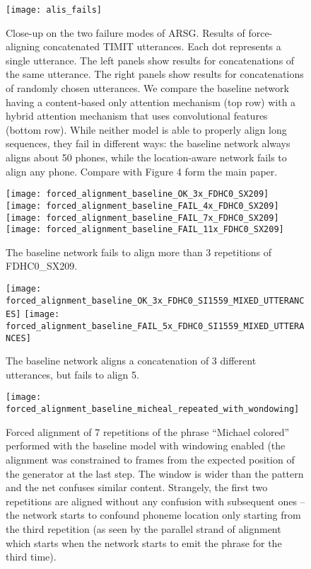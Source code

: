 \documentclass{article}
\begin{document}
\begin{figure}[h]
  \centering
  \texttt{[image: alis\_fails]}
  \caption[Results of force-aligning of long utterances.]{Close-up on
    the two failure modes of ARSG. Results of
    force-aligning concatenated TIMIT utterances. Each dot represents
    a single utterance. The left panels show results for
    concatenations of the same utterance. The right panels show
    results for concatenations of randomly chosen utterances. We
    compare the baseline network having a content-based only attention
    mechanism (top row) with a hybrid attention mechanism that uses
    convolutional features (bottom row). While neither model is able
    to properly align long sequences, they fail in different ways: the
    baseline network always aligns about 50 phones, while the
    location-aware network fails to align any phone. Compare with
    Figure 4 form the main paper.}
\end{figure}

\begin{sidewaysfigure}[h]
  \texttt{[image: forced\_alignment\_baseline\_OK\_3x\_FDHC0\_SX209]}
  \texttt{[image: forced\_alignment\_baseline\_FAIL\_4x\_FDHC0\_SX209]}
  \texttt{[image: forced\_alignment\_baseline\_FAIL\_7x\_FDHC0\_SX209]}
  \texttt{[image: forced\_alignment\_baseline\_FAIL\_11x\_FDHC0\_SX209]}
  \caption{The baseline network fails to align more than 3 repetitions
    of FDHC0\_SX209.}
\end{sidewaysfigure}

\begin{sidewaysfigure}[h]
  \texttt{[image: forced\_alignment\_baseline\_OK\_3x\_FDHC0\_SI1559\_MIXED\_UTTERANCES]}
  \texttt{[image: forced\_alignment\_baseline\_FAIL\_5x\_FDHC0\_SI1559\_MIXED\_UTTERANCES]}
  \caption{The baseline network aligns a concatenation of 3 different
    utterances, but fails to align 5.}
\end{sidewaysfigure}

\begin{sidewaysfigure}[h]
  \texttt{[image: forced\_alignment\_baseline\_micheal\_repeated\_with\_wondowing]}
  \caption{Forced alignment of 7 repetitions of the phrase ``Michael
    colored'' performed with the baseline model with windowing enabled
  (the alignment was constrained to  frames from the expected
  position of the generator at the last step. The window is wider than
the pattern and the net confuses similar content. Strangely, the first
two repetitions are aligned without any confusion with subsequent ones --
the network starts to confound phoneme location only starting from the
third repetition (as seen by the parallel strand of alignment which
starts when the network starts to emit the phrase for the third time).
}
\end{sidewaysfigure}
\end{document}

